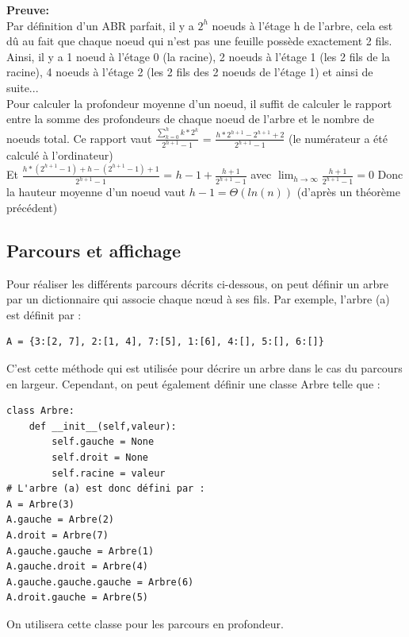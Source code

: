 \documentclass{report}
\begin{document}
\textbf{Preuve:} \\
Par définition d'un ABR parfait, il y a $2^h$ noeuds à l'étage h de l'arbre, cela est dû au fait que chaque noeud qui n'est pas une feuille possède exactement 2 fils. \\
Ainsi, il y a 1 noeud à l'étage 0 (la racine), 2 noeuds à l'étage 1 (les 2 fils de la racine), 4 noeuds à l'étage 2 (les 2 fils des 2 noeuds de l'étage 1) et ainsi de suite... \\
Pour calculer la profondeur moyenne d'un noeud, il suffit de calculer le rapport entre la somme des profondeurs de chaque noeud de l'arbre et le nombre de noeuds total. \newline \newline
Ce rapport vaut $\frac{\sum_{k=0}^{h} k*2^k}{2^{h+1}-1}$ = $\frac{h*2^{h+1}-2^{h+1}+2}{2^{h+1}-1}$ (le numérateur a été calculé à l'ordinateur) \\
Et $\frac{h*(2^{h+1}-1)+h-(2^{h+1}-1)+1}{2^{h+1}-1}$ = $h-1 + \frac{h+1}{2^{h+1}-1}$ avec $\lim_{h\to\infty} \frac{h+1}{2^{h+1}-1}=0$ \newline \newline
Donc la hauteur moyenne d'un noeud vaut $h-1=\Theta(ln(n))$ (d'après un théorème précédent)



\subsection{Parcours et affichage}

Pour réaliser les différents parcours décrits ci-dessous, on peut définir un arbre par un dictionnaire qui associe chaque nœud à ses fils. Par exemple, l'arbre (a) est définit par :
\begin{lstlisting}
A = {3:[2, 7], 2:[1, 4], 7:[5], 1:[6], 4:[], 5:[], 6:[]}
\end{lstlisting}
C'est cette méthode qui est utilisée pour décrire un arbre dans le cas du parcours en largeur. Cependant, on peut également définir une classe Arbre telle que :
\begin{lstlisting}
class Arbre: 
    def __init__(self,valeur): 
        self.gauche = None
        self.droit = None
        self.racine = valeur
# L'arbre (a) est donc défini par :
A = Arbre(3) 
A.gauche = Arbre(2) 
A.droit = Arbre(7) 
A.gauche.gauche = Arbre(1) 
A.gauche.droit = Arbre(4)
A.gauche.gauche.gauche = Arbre(6)
A.droit.gauche = Arbre(5)
\end{lstlisting}
On utilisera cette classe pour les parcours en profondeur.
\end{document}
